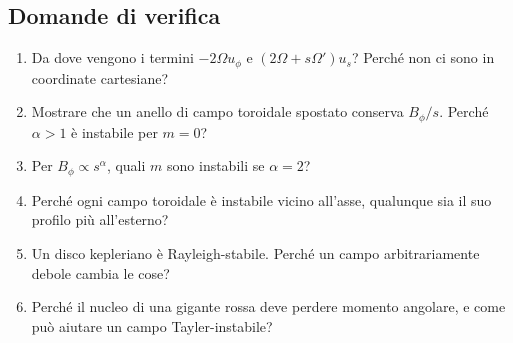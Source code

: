\subsection*{Domande di verifica}
\begin{enumerate}
\item Da dove vengono i termini $-2\Omega u_\phi$ e $(2\Omega+s\Omega')u_s$? Perché non ci sono in coordinate cartesiane?
\item Mostrare che un anello di campo toroidale spostato conserva $B_\phi/s$. Perché $\alpha>1$ è instabile per $m=0$?
\item Per $B_\phi\propto s^\alpha$, quali $m$ sono instabili se $\alpha=2$?
\item Perché ogni campo toroidale è instabile vicino all'asse, qualunque sia il suo profilo più all'esterno?
\item Un disco kepleriano è Rayleigh-stabile. Perché un campo arbitrariamente debole cambia le cose?
\item Perché il nucleo di una gigante rossa deve perdere momento angolare, e come può aiutare un campo Tayler-instabile?
\end{enumerate}
